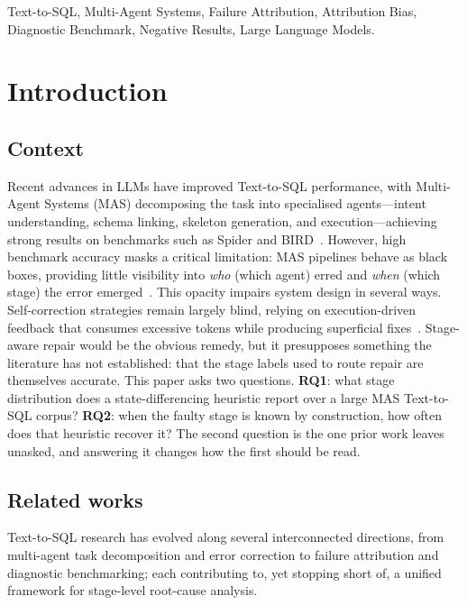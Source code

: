 \documentclass[conference]{IEEEtran}
\begin{document}
\begin{IEEEkeywords}
Text-to-SQL, Multi-Agent Systems, Failure Attribution, Attribution Bias,
Diagnostic Benchmark, Negative Results, Large Language Models.
\end{IEEEkeywords}

\section{Introduction}
\subsection{Context}
Recent advances in LLMs have improved Text-to-SQL performance, with Multi-Agent Systems (MAS) decomposing the task into specialised agents---intent understanding, schema linking, skeleton generation, and execution---achieving strong results on benchmarks such as Spider and BIRD~\cite{yu_spider_2018}. However, high benchmark accuracy masks a critical limitation: MAS pipelines behave as black boxes, providing little visibility into \emph{who} (which agent) erred and \emph{when} (which stage) the error emerged~\cite{huo_bird_interact_2026, zhu_scot2s_2025}. This opacity impairs system design in several ways. Self-correction strategies remain largely blind, relying on execution-driven
feedback that consumes excessive tokens while producing superficial
fixes~\cite{zhu_scot2s_2025}. Stage-aware repair would be the obvious remedy,
but it presupposes something the literature has not established: that the stage
labels used to route repair are themselves accurate. This paper asks two
questions. \textbf{RQ1}: what stage distribution does a state-differencing
heuristic report over a large MAS Text-to-SQL corpus? \textbf{RQ2}: when the
faulty stage is known by construction, how often does that heuristic recover
it? The second question is the one prior work leaves unasked, and answering it
changes how the first should be read.


\subsection{Related works}
\label{sec:related}
Text-to-SQL research has evolved along several interconnected directions, from multi-agent task decomposition and error correction to failure attribution and diagnostic benchmarking; each contributing to, yet stopping short of, a unified framework for stage-level root-cause analysis.
\end{document}
